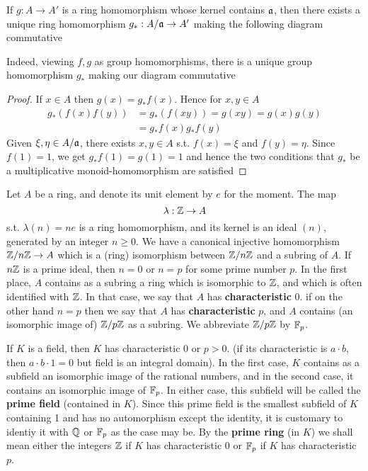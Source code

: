 \documentclass[11pt]{article}
\begin{document}
\begin{proposition}[]
If \(g:A\to A'\) is a ring homomorphism whose kernel contains \(\mathfrak{a}\), then there exists a unique
ring homomorphism \(g_*:A/\mathfrak{a}\to A'\) making the following diagram commutative
\begin{center}\end{center}
\end{proposition}

Indeed, viewing \(f,g\) as group homomorphisms, there is a unique group homomorphism \(g_*\)
making our diagram commutative

\begin{proof}
If \(x\in A\) then \(g(x)=g_*f(x)\). Hence for \(x,y\in A\)
\begin{align*}
g_*(f(x)f(y))&=g_*(f(xy))=g(xy)=g(x)g(y)\\
&=g_*f(x)g_*f(y)
\end{align*}
Given \(\xi,\eta\in A/\mathfrak{a}\), there exists \(x,y\in A\) s.t. \(f(x)=\xi\) and \(f(y)=\eta\). Since \(f(1)=1\), we
get \(g_*f(1)=g(1)=1\) and hence the two conditions that \(g_*\) be a multiplicative
monoid-homomorphism are satisfied
\end{proof}

Let \(A\) be a ring, and denote its unit element by \(e\) for the moment. The map
\begin{equation*}
\lambda:\mathbb{Z}\to A
\end{equation*}
s.t. \(\lambda(n)=ne\) is a ring homomorphism, and its kernel is an ideal \((n)\), generated by an
integer \(n\ge 0\). We have a canonical injective homomorphism \(\mathbb{Z}/n\mathbb{Z}\to A\) which is a (ring)
isomorphism between \(\mathbb{Z}/n\mathbb{Z}\) and a subring of \(A\). If \(n\mathbb{Z}\) is a prime ideal, then \(n=0\)
or \(n=p\) for some prime number \(p\). In the first place, \(A\) contains as a subring a ring
which is isomorphic to \(\mathbb{Z}\), and which is often identified with \(\mathbb{Z}\). In that case, we say
that \(A\) has \textbf{characteristic} 0. if on the other hand \(n=p\) then we say that \(A\) has
\textbf{characteristic} \(p\), and \(A\) contains (an isomorphic image of) \(\mathbb{Z}/p\mathbb{Z}\) as a subring. We
abbreviate \(\mathbb{Z}/p\mathbb{Z}\) by \(\mathbb{F}_p\).

If \(K\) is a field, then \(K\) has characteristic 0 or \(p>0\). (if its characteristic
is \(a\cdot b\), then \(a\cdot b\cdot 1=0\) but field is an integral domain). In the first case, \(K\)
contains as a subfield an isomorphic image of the rational numbers, and in the second case, it
contains an isomorphic image of \(\mathbb{F}_p\). In either case, this subfield will be called the \textbf{prime
field} (contained in \(K\)). Since this prime field is the smallest subfield of \(K\) containing 1
and has no automorphism except the identity, it is customary to identiy it with \(\mathbb{Q}\) or \(\mathbb{F}_p\)
as the case may be. By the \textbf{prime ring} (in \(K\)) we shall mean either the integers \(\mathbb{Z}\) if \(K\)
has characteristic 0 or \(\mathbb{F}_p\) if \(K\) has characteristic \(p\). \label{Problem1}
\end{document}
